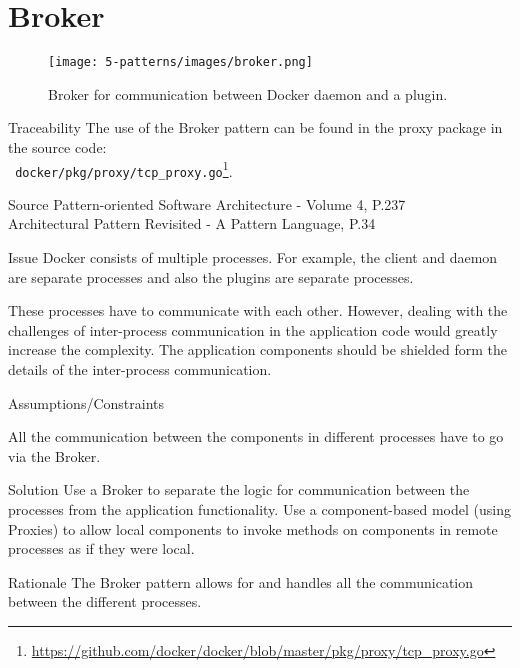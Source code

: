 \section{Broker}
\begin{figure}[H]
\centering
\texttt{[image: 5-patterns/images/broker.png]}
\caption{Broker for communication between Docker daemon and a plugin.}
\label{fig:broker-pattern}
\end{figure}

\begin{patdescription}
\item [Traceability]
The use of the Broker pattern can be found in the proxy package in the source code:\\
\verb| docker/pkg/proxy/tcp_proxy.go|\footnote{\url{https://github.com/docker/docker/blob/master/pkg/proxy/tcp_proxy.go}}.

\item [Source]
Pattern-oriented Software Architecture - Volume 4, P.237 \cite{wiley4} \\
Architectural Pattern Revisited - A Pattern Language, P.34 \cite{avgeriou2005architectural}

\item [Issue]
Docker consists of multiple processes. For example, the client and daemon are separate processes and also the plugins are separate processes.

These processes have to communicate with each other. However, dealing with the challenges of inter-process communication in the application code would greatly increase the complexity.
The application components should be shielded form the details of the inter-process communication.

\item [Assumptions/Constraints]
\begin{mynesteditemlist}
\item All the communication between the components in different processes have to go via the Broker.
\end{mynesteditemlist}

\item [Solution]
Use a Broker to separate the logic for communication between the processes from the application functionality. Use a component-based model (using Proxies) to allow local components to invoke methods on components in remote processes as if they were local.

\item [Rationale]  
The Broker pattern allows for and handles all the communication between the different processes. 


\end{patdescription}
